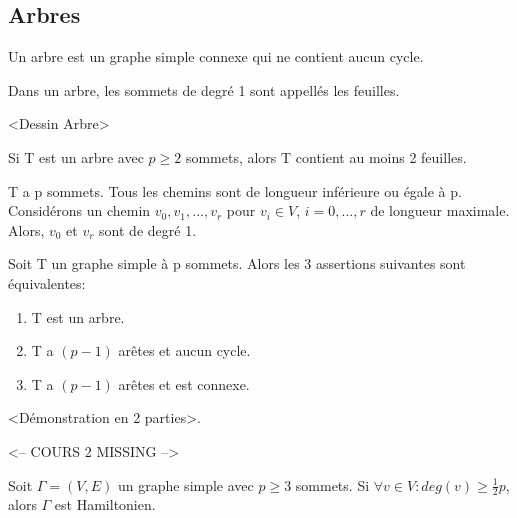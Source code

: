 
\subsection{Arbres}

\begin{defn}
Un arbre est un graphe simple connexe qui ne contient aucun cycle.\\
\end{defn}

\begin{defn}
Dans un arbre, les sommets de degré 1 sont appellés les feuilles.\\
\end{defn}

\begin{exmp}
<Dessin Arbre>
\end{exmp}

\begin{prop}
Si T est un arbre avec $p\geq2$ sommets, alors T contient au moins 2 feuilles.
\end{prop}

\begin{demo}
T a p sommets. Tous les chemins sont de longueur inférieure ou égale à p. Considérons un chemin $v_{0},v_{1},...,v_{r}$ pour $v_{i} \in V$, $i=0,...,r$ de longueur maximale. Alors, $v_{0}$ et $v_{r}$ sont de degré 1.\\
\end{demo}

\begin{thrm}
Soit T un graphe simple à p sommets. Alors les 3 assertions suivantes sont équivalentes:
	\begin{enumerate}
	\item T est un arbre.
	\item T a $(p-1)$ arêtes et aucun cycle.
	\item T a $(p-1)$ arêtes et est connexe.
	\end{enumerate}
\end{thrm}

\begin{demo}
<Démonstration en 2 parties>.
\end{demo}


\newpage
<-- COURS 2 MISSING -->
\newpage

\begin{thrm}[Dirac 1950]
Soit $\Gamma = (V,E)$ un graphe simple avec $p \geq 3$ sommets. Si $\forall v \in V: deg(v) \geq \frac{1}{2}p$, alors $\Gamma$ est Hamiltonien.
\end{thrm}

